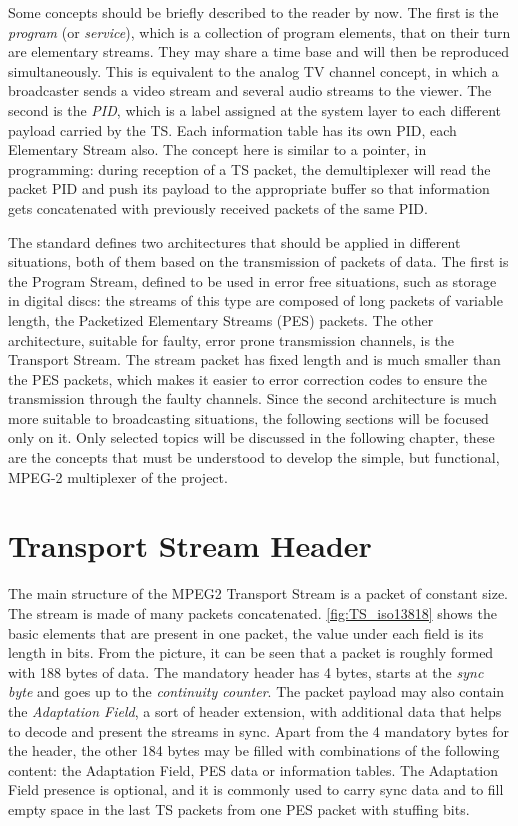 \documentclass[
	12pt,				%
	openright,			%
	twoside,			%
	a4paper,			%
	brazil,
	french,				%
	english
	]{abntex2}
\begin{document}
Some concepts should be briefly described to the reader by now. The first is the \textit{program} (or \textit{service}), which is a collection of program elements, that on their turn are elementary streams. They may share a time base and will then be reproduced simultaneously. This is equivalent to the analog TV channel concept, in which a broadcaster sends a video stream and several audio streams to the viewer. The second is the \textit{PID}, which is a label assigned at the system layer to each different payload carried by the TS. Each information table has its own PID, each Elementary Stream also. The concept here is similar to a pointer, in programming: during reception of a TS packet, the demultiplexer will read the packet PID and push its payload to the appropriate buffer so that information gets concatenated with previously received packets of the same PID.

The standard defines two architectures that should be applied in different situations, both of them based on the transmission of packets of data. The first is the Program Stream, defined to be used in error free situations, such as storage in digital discs: the streams of this type are composed of long packets of variable length, the Packetized Elementary Streams (PES) packets. The other architecture, suitable for faulty, error prone transmission channels, is the Transport Stream. The stream packet has fixed length and is much smaller than the PES packets, which makes it easier to error correction codes to ensure the transmission through the faulty channels. Since the second architecture is much more suitable to broadcasting situations, the following sections will be focused only on it. Only selected topics will be discussed in the following chapter, these are the concepts that must be understood to develop the simple, but functional, MPEG-2 multiplexer of the project.

\section{Transport Stream Header}
\label{ts_header}
The main structure of the MPEG2 Transport Stream is a packet of constant size. The stream is made of many packets concatenated. \autoref{fig:TS_iso13818} shows the basic elements that are present in one packet, the value under each field is its length in bits. From the picture, it can be seen that a packet is roughly formed with 188 bytes of data. The mandatory header has 4 bytes, starts at the \textit{sync byte} and goes up to the \textit{continuity counter}. The packet payload may also contain the \textit{Adaptation Field}, a sort of header extension, with additional data that helps to decode and present the streams in sync. Apart from the 4 mandatory bytes for the header, the other 184 bytes may be filled with combinations of the following content: the Adaptation Field, PES data or information tables. The Adaptation Field presence is optional, and it is commonly used to carry sync data and to fill empty space in the last TS packets from one PES packet with stuffing bits.
\end{document}
